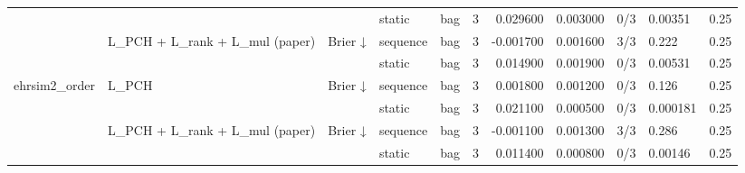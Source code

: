 \begin{tabular}{lllllrrrlll}
 &  &  & static & bag & 3 & 0.029600 & 0.003000 & 0/3 & 0.00351 & 0.25 \\
\cline{2-11} \cline{3-11}
 & \multirow[t]{2}{*}{L\_PCH + L\_rank + L\_mul (paper)} & \multirow[t]{2}{*}{Brier ↓} & sequence & bag & 3 & -0.001700 & 0.001600 & 3/3 & 0.222 & 0.25 \\
 &  &  & static & bag & 3 & 0.014900 & 0.001900 & 0/3 & 0.00531 & 0.25 \\
\cline{1-11} \cline{2-11} \cline{3-11}
\multirow[t]{4}{*}{ehrsim2\_order} & \multirow[t]{2}{*}{L\_PCH} & \multirow[t]{2}{*}{Brier ↓} & sequence & bag & 3 & 0.001800 & 0.001200 & 0/3 & 0.126 & 0.25 \\
 &  &  & static & bag & 3 & 0.021100 & 0.000500 & 0/3 & 0.000181 & 0.25 \\
\cline{2-11} \cline{3-11}
 & \multirow[t]{2}{*}{L\_PCH + L\_rank + L\_mul (paper)} & \multirow[t]{2}{*}{Brier ↓} & sequence & bag & 3 & -0.001100 & 0.001300 & 3/3 & 0.286 & 0.25 \\
 &  &  & static & bag & 3 & 0.011400 & 0.000800 & 0/3 & 0.00146 & 0.25 \\
\cline{1-11} \cline{2-11} \cline{3-11}
\bottomrule
\end{tabular}
